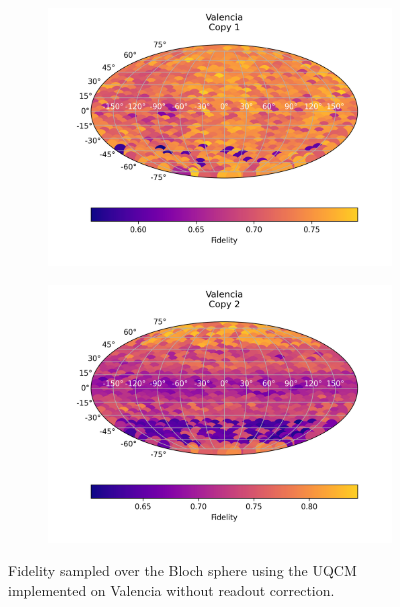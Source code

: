 \begin{figure}[H]
    \centering
    \begin{subfigure}{.5\textwidth}
      \centering
      \includegraphics[width=\textwidth]{Figures/UQCM/IBM/FullSphere/results_valencia_copy1.png}
    \end{subfigure}%
    \begin{subfigure}{.5\textwidth}
      \centering
      \includegraphics[width=\textwidth]{Figures/UQCM/IBM/FullSphere/results_valencia_copy2.png}
    \end{subfigure}
    \caption{Fidelity sampled over the Bloch sphere using the UQCM implemented on Valencia without readout correction.}
\end{figure}



